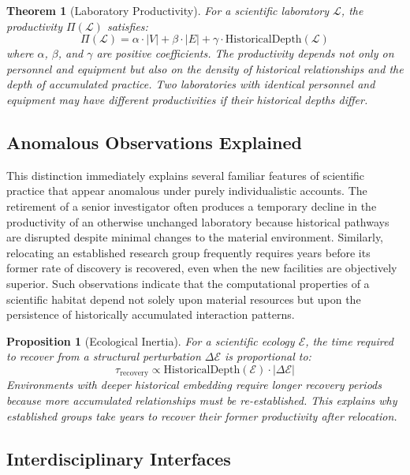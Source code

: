 \documentclass[12pt,oneside]{article}
\newtheorem{theorem}[definition]{Theorem}
\newtheorem{proposition}[definition]{Proposition}
\theoremstyle{remark}
\begin{document}
\begin{theorem}[Laboratory Productivity]
For a scientific laboratory \(\mathcal{L}\), the productivity \(\Pi(\mathcal{L})\) satisfies:
\[
\Pi(\mathcal{L}) = \alpha \cdot |V| + \beta \cdot |E| + \gamma \cdot \text{HistoricalDepth}(\mathcal{L})
\]
where \(\alpha\), \(\beta\), and \(\gamma\) are positive coefficients. The productivity depends not only on personnel and equipment but also on the density of historical relationships and the depth of accumulated practice. Two laboratories with identical personnel and equipment may have different productivities if their historical depths differ.
\end{theorem}

\subsection{Anomalous Observations Explained}

This distinction immediately explains several familiar features of scientific practice that appear anomalous under purely individualistic accounts. The retirement of a senior investigator often produces a temporary decline in the productivity of an otherwise unchanged laboratory because historical pathways are disrupted despite minimal changes to the material environment. Similarly, relocating an established research group frequently requires years before its former rate of discovery is recovered, even when the new facilities are objectively superior. Such observations indicate that the computational properties of a scientific habitat depend not solely upon material resources but upon the persistence of historically accumulated interaction patterns.

\begin{proposition}[Ecological Inertia]
For a scientific ecology \(\mathcal{E}\), the time required to recover from a structural perturbation \(\Delta \mathcal{E}\) is proportional to:
\[
\tau_{\text{recovery}} \propto \text{HistoricalDepth}(\mathcal{E}) \cdot |\Delta \mathcal{E}|
\]
Environments with deeper historical embedding require longer recovery periods because more accumulated relationships must be re-established. This explains why established groups take years to recover their former productivity after relocation.
\end{proposition}

\subsection{Interdisciplinary Interfaces}
\end{document}

